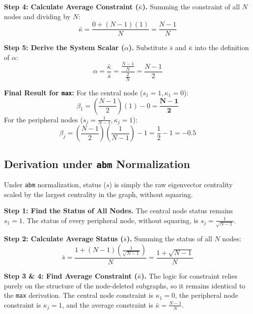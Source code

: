 \textbf{Step 4: Calculate Average Constraint ($\bar{\kappa}$).}
Summing the constraint of all $N$ nodes and dividing by $N$:
\begin{equation}
    \bar{\kappa} = \frac{0 + (N-1)(1)}{N} = \frac{N-1}{N}
\end{equation}

\textbf{Step 5: Derive the System Scalar ($\alpha$).}
Substitute $\bar{s}$ and $\bar{\kappa}$ into the definition of $\alpha$:
\begin{equation}
    \alpha = \frac{\bar{\kappa}}{\bar{s}} = \frac{\frac{N-1}{N}}{\frac{2}{N}} = \frac{N-1}{2}
\end{equation}

\textbf{Final Result for \texttt{max}:}
For the central node ($s_1 = 1, \kappa_1 = 0$):
\begin{equation}
    \beta_1 = \left( \frac{N-1}{2} \right)(1) - 0 = \mathbf{\frac{N-1}{2}}
\end{equation}
For the peripheral nodes ($s_j = \frac{1}{N-1}, \kappa_j = 1$):
\begin{equation}
    \beta_j = \left( \frac{N-1}{2} \right) \left( \frac{1}{N-1} \right) - 1 = \frac{1}{2} - 1 = \mathbf{-0.5}
\end{equation}

\subsection*{Derivation under \texttt{abm} Normalization}

Under \texttt{abm} normalization, status ($s$) is simply the raw eigenvector centrality scaled by the largest centrality in the graph, without squaring.

\textbf{Step 1: Find the Status of All Nodes.}
The central node status remains $s_1 = 1$. The status of every peripheral node, without squaring, is $s_j = \frac{1}{\sqrt{N-1}}$.

\textbf{Step 2: Calculate Average Status ($\bar{s}$).}
Summing the status of all $N$ nodes:
\begin{equation}
    \bar{s} = \frac{1 + (N-1)\left(\frac{1}{\sqrt{N-1}}\right)}{N} = \frac{1 + \sqrt{N-1}}{N}
\end{equation}

\textbf{Step 3 \& 4: Find Average Constraint ($\bar{\kappa}$).}
The logic for constraint relies purely on the structure of the node-deleted subgraphs, so it remains identical to the \texttt{max} derivation. The central node constraint is $\kappa_1 = 0$, the peripheral node constraint is $\kappa_j = 1$, and the average constraint is $\bar{\kappa} = \frac{N-1}{N}$.

